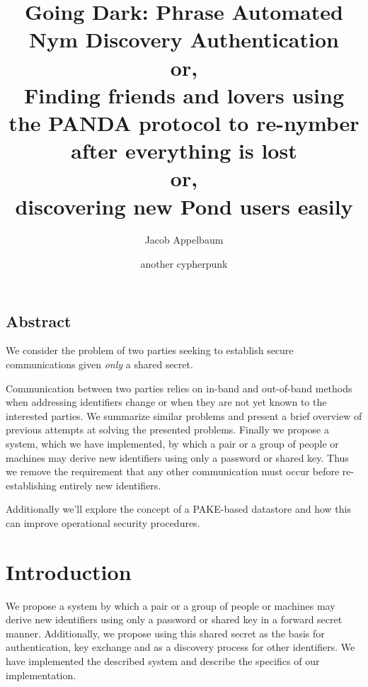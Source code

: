 \documentclass[letterpaper,twocolumn,10pt]{article}
\begin{document}
\date{}

\title{
\Large \bf Going Dark: Phrase Automated Nym Discovery Authentication\\
\small or,\\
Finding friends and lovers using the PANDA protocol to re-nymber after everything is lost\\
\small or, \\
discovering new Pond users easily
}

\author{
{\rm Jacob Appelbaum}\\
\and
{\rm another cypherpunk}\\
}

\maketitle

\thispagestyle{empty}

\subsection*{Abstract}

We consider the problem of two parties seeking to establish secure
communications given {\it only} a shared secret.

Communication between two parties relies on in-band and out-of-band methods
when addressing identifiers change or when they are not yet known to the
interested parties. We summarize similar problems and present a brief overview
of previous attempts at solving the presented problems. Finally we propose a
system, which we have implemented, by which a pair or a group of people or
machines may derive new identifiers using only a password or shared key. Thus
we remove the requirement that any other communication must occur before
re-establishing entirely new identifiers.

Additionally we'll explore the concept of a PAKE-based datastore and how
this can improve operational security procedures.

\section{Introduction}

We propose a system by which a pair or a group of people or machines may derive
new identifiers using only a password or shared key in a forward secret manner.
Additionally, we propose using this shared secret as the basis for
authentication, key exchange and as a discovery process for other identifiers.
We have implemented the described system and describe the specifics of our
implementation.
\end{document}
